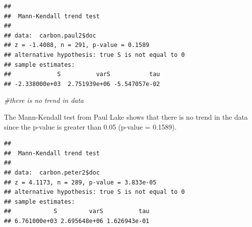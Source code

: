 \documentclass[12pt,]{article}
\newenvironment{Shaded}{\begin{snugshade}}{\end{snugshade}}
\newcommand{\KeywordTok}[1]{\textcolor[rgb]{0.13,0.29,0.53}{\textbf{#1}}}
\newcommand{\CommentTok}[1]{\textcolor[rgb]{0.56,0.35,0.01}{\textit{#1}}}
\newcommand{\OperatorTok}[1]{\textcolor[rgb]{0.81,0.36,0.00}{\textbf{#1}}}
\newcommand{\NormalTok}[1]{#1}
\begin{document}
\begin{Shaded}
\end{Shaded}

\begin{verbatim}
## 
##  Mann-Kendall trend test
## 
## data:  carbon.paul2$doc
## z = -1.4088, n = 291, p-value = 0.1589
## alternative hypothesis: true S is not equal to 0
## sample estimates:
##             S          varS           tau 
## -2.338000e+03  2.751939e+06 -5.547057e-02
\end{verbatim}

\begin{Shaded}
\begin{Highlighting}[]
\CommentTok{#there is no trend in data}
\end{Highlighting}
\end{Shaded}

The Mann-Kendall test from Paul Lake shows that there is no trend in the
data since the p-value is greater than 0.05 (p-value = 0.1589).

\begin{Shaded}
\end{Shaded}

\begin{verbatim}
## 
##  Mann-Kendall trend test
## 
## data:  carbon.peter2$doc
## z = 4.1173, n = 289, p-value = 3.833e-05
## alternative hypothesis: true S is not equal to 0
## sample estimates:
##            S         varS          tau 
## 6.761000e+03 2.695648e+06 1.626943e-01
\end{verbatim}

\begin{Shaded}
\end{Shaded}
\end{document}
